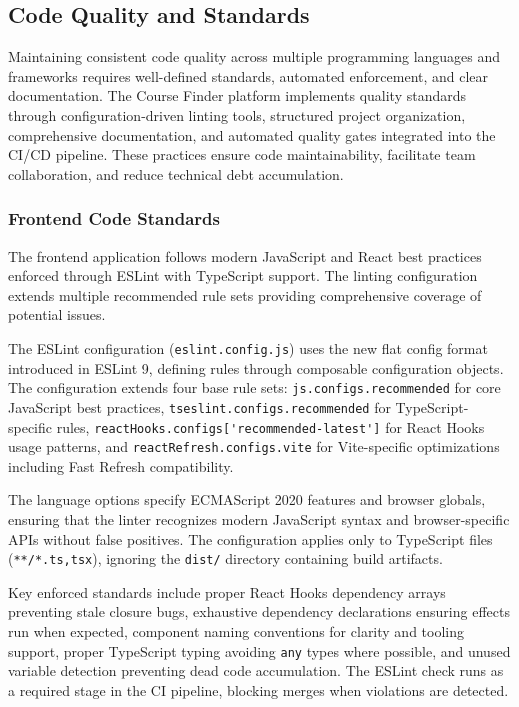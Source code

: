 \documentclass[12pt,a4paper]{article}
\begin{document}
\subsection{Code Quality and Standards}

Maintaining consistent code quality across multiple programming languages and frameworks requires well-defined standards, automated enforcement, and clear documentation. The Course Finder platform implements quality standards through configuration-driven linting tools, structured project organization, comprehensive documentation, and automated quality gates integrated into the CI/CD pipeline. These practices ensure code maintainability, facilitate team collaboration, and reduce technical debt accumulation.

\subsubsection{Frontend Code Standards}

The frontend application follows modern JavaScript and React best practices enforced through ESLint with TypeScript support. The linting configuration extends multiple recommended rule sets providing comprehensive coverage of potential issues.\newline

The ESLint configuration (\texttt{eslint.config.js}) uses the new flat config format introduced in ESLint 9, defining rules through composable configuration objects. The configuration extends four base rule sets: \texttt{js.configs.recommended} for core JavaScript best practices, \texttt{tseslint.configs.recommended} for TypeScript-specific rules, \nolinkurl{reactHooks.configs['recommended-latest']}  for React Hooks usage patterns, and \nolinkurl{reactRefresh.configs.vite} for Vite-specific optimizations including Fast Refresh compatibility.\newline

The language options specify ECMAScript 2020 features and browser globals, ensuring that the linter recognizes modern JavaScript syntax and browser-specific APIs without false positives. The configuration applies only to TypeScript files (\texttt{**/*.{ts,tsx}}), ignoring the \texttt{dist/} directory containing build artifacts.\newline

Key enforced standards include proper React Hooks dependency arrays preventing stale closure bugs, exhaustive dependency declarations ensuring effects run when expected, component naming conventions for clarity and tooling support, proper TypeScript typing avoiding \texttt{any} types where possible, and unused variable detection preventing dead code accumulation. The ESLint check runs as a required stage in the CI pipeline, blocking merges when violations are detected.\newline
\end{document}
